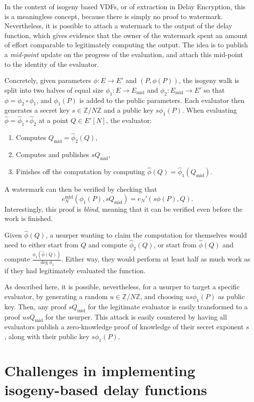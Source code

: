 \documentclass{llncs}
\newcommand{\Z}{\mathbb{Z}}
\newcommand{\Emid}{E_\mathrm{mid}}
\newcommand{\Qmid}{Q_\mathrm{mid}}
\begin{document}
In the context of isogeny based VDFs, or of extraction in Delay
Encryption, this is a meaningless concept, because there is simply no
proof to watermark. %
Nevertheless, it is possible to attach a watermark to the output of
the delay function, which gives evidence that the owner of the
watermark spent an amount of effort comparable to legitimately
computing the output. %
The idea is to publish a \emph{mid-point} update on the progress of
the evaluation, and attach this mid-point to the identity of the
evaluator.

Concretely, given parameters $\phi:E\to E'$ and $(P,\phi(P))$, the
isogeny walk is split into two halves of equal size
$\phi_1:E\to \Emid$ and $\phi_2:\Emid\to E'$ so that
$\phi=\phi_2\circ\phi_1$, and $\phi_1(P)$ is added to the public parameters. %
Each evaluator then generates a secret key $s\in\Z/N\Z$ and a public
key $s\phi_1(P)$. %
When evaluating $\hat\phi=\hat\phi_1\circ\hat\phi_2$ at a point
$Q\in E'[N]$, the evaluator:
\begin{enumerate}
\item Computes $\Qmid=\hat\phi_2(Q)$,
\item Computes and publishes $s\Qmid$,
\item Finishes off the computation by computing
  $\hat\phi(Q)=\hat\phi_1(\Qmid)$.
\end{enumerate}
A watermark can then be verified by checking that
\[e_N^\mathrm{mid}(\phi_1(P),s\Qmid) = e_N'(s\phi(P),Q).\]
Interestingly, this proof is \emph{blind}, meaning that it can be
verified even before the work is finished.

Given $\hat\phi(Q)$, a usurper wanting to claim the computation for
themselves would need to either start from $Q$ and compute
$\hat\phi_2(Q)$, or start from $\hat\phi(Q)$ and compute
$\frac{\phi_1(\hat\phi(Q))}{\deg\phi_1}$. %
Either way, they would perform at least half as much work as if they
had legitimately evaluated the function.

As described here, it is possible, nevertheless, for a usurper to
target a specific evaluator, by generating a random $u\in\Z/N\Z$, and
choosing $us\phi_1(P)$ as public key. %
Then, any proof $s\Qmid$ for the legitimate evaluator is easily
transformed to a proof $us\Qmid$ for the usurper. %
This attack is easily countered by having all evaluators publish a
zero-knowledge proof of knowledge of their secret exponent $s$, along
with their public key $s\phi_1(P)$. %


\section{Challenges in implementing isogeny-based delay functions}
\label{sec:secure-impl-isog}
\end{document}
